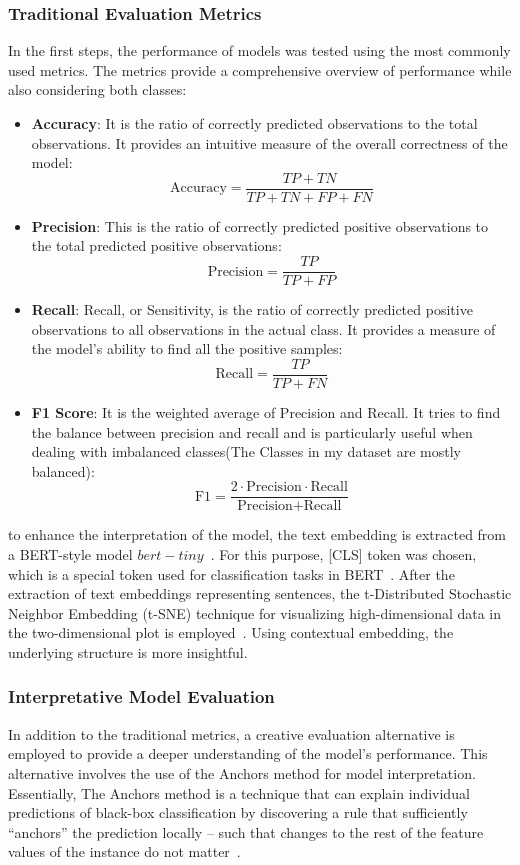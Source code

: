 \documentclass[11pt,a4paper]{article}
\begin{document}
\subsubsection{Traditional Evaluation Metrics}
In the first steps, the performance of models was tested using the most commonly used metrics. The metrics provide a comprehensive overview of performance while also considering both classes:
\begin{itemize}
    \item \textbf{Accuracy}: It is the ratio of correctly predicted observations to the total observations. It provides an intuitive measure of the overall correctness of the model:
    $$
    \text{Accuracy} = \frac{TP+TN}{TP+TN+FP+FN}
    $$
    \item \textbf{Precision}: This is the ratio of correctly predicted positive observations to the total predicted positive observations:
    $$
    \text{Precision} = \frac{TP}{TP+FP}
    $$
    \item \textbf{Recall}: Recall, or Sensitivity, is the ratio of correctly predicted positive observations to all observations in the actual class. It provides a measure of the model’s ability to find all the positive samples:
    $$
    \text{Recall} = \frac{TP}{TP+FN}
    $$
    \item \textbf{F1 Score}: It is the weighted average of Precision and Recall. It tries to find the balance between precision and recall and is particularly useful when dealing with imbalanced classes(The Classes in my dataset are mostly balanced):
    $$
    \text{F1} = \frac{2 \cdot \text{Precision} \cdot \text{Recall}}{\text{Precision} + \text{Recall}}
    $$
\end{itemize}
to enhance the interpretation of the model, the text embedding is extracted from a BERT-style model $bert-tiny$~\cite{iuliaturc_2019_wellread, bhargava_2021_generalization}. For this purpose, [CLS] token was chosen, which is a special token used for classification tasks in BERT~\cite{devlin_2018_bert}. After the extraction of text embeddings representing sentences, the t-Distributed Stochastic Neighbor Embedding (t-SNE) technique for visualizing high-dimensional data in the two-dimensional plot is employed~\cite{com_2008_visualizing, arora_2018_an}. Using contextual embedding, the underlying structure is more insightful.
\subsubsection{Interpretative Model Evaluation}
In addition to the traditional metrics, a creative evaluation alternative is employed to provide a deeper understanding of the model’s performance. This alternative involves the use of the Anchors method for model interpretation.
Essentially, The Anchors method is a technique that can explain individual predictions of black-box classification by discovering a rule that sufficiently “anchors” the prediction locally – such that changes to the rest of the feature values of the instance do not matter~\cite{ribeiro_2018_anchors}.
\end{document}
